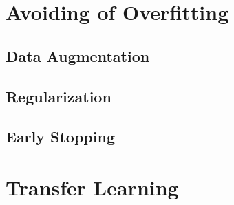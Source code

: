 \documentclass[sigconf,nonacm]{acmart}
\begin{document}
\section{Avoiding of Overfitting}

\subsection{Data Augmentation}

\subsection{Regularization}

\subsection{Early Stopping}

\section{Transfer Learning}



\end{document}
